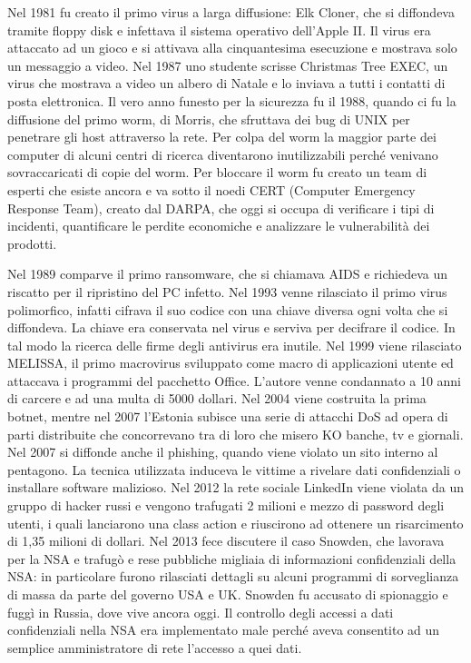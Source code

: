 \vspace{4mm}

Nel 1981 fu creato il primo virus a larga diffusione: Elk Cloner, che si diffondeva tramite floppy disk e infettava il sistema operativo dell'Apple II. Il virus era attaccato ad un gioco e si attivava alla cinquantesima esecuzione e mostrava solo un messaggio a video. Nel 1987 uno studente scrisse Christmas Tree EXEC, un virus che mostrava a video un albero di Natale e lo inviava a tutti i contatti di posta elettronica. Il vero anno funesto per la sicurezza fu il 1988, quando ci fu la diffusione del primo worm, di Morris, che sfruttava dei bug di UNIX per penetrare gli host attraverso la rete. Per colpa del worm la maggior parte dei computer di alcuni centri di ricerca diventarono inutilizzabili perché venivano sovraccaricati di copie del worm. Per bloccare il worm fu creato un team di esperti che esiste ancora e va sotto il noedi CERT (Computer Emergency Response Team), creato dal DARPA, che oggi si occupa di verificare i tipi di incidenti, quantificare le perdite economiche e analizzare le vulnerabilità dei prodotti.

\vspace{4mm}

Nel 1989 comparve il primo ransomware, che si chiamava AIDS e richiedeva un riscatto per il ripristino del PC infetto. Nel 1993 venne rilasciato il primo virus polimorfico, infatti cifrava il suo codice con una chiave diversa ogni volta che si diffondeva. La chiave era conservata nel virus e serviva per decifrare il codice. In tal modo la ricerca delle firme degli antivirus era inutile. Nel 1999 viene rilasciato MELISSA, il primo macrovirus sviluppato come macro di applicazioni utente ed attaccava i programmi del pacchetto Office. L'autore venne condannato a 10 anni di carcere e ad una multa di 5000 dollari. Nel 2004 viene costruita la prima botnet, mentre nel 2007 l'Estonia subisce una serie di attacchi DoS ad opera di parti distribuite che concorrevano tra di loro che misero KO banche, tv e giornali. Nel 2007 si diffonde anche il phishing, quando viene violato un sito interno al pentagono. La tecnica utilizzata induceva le vittime a rivelare dati confidenziali o installare software malizioso. Nel 2012 la rete sociale LinkedIn viene violata da un gruppo di hacker russi e vengono trafugati 2 milioni e mezzo di password degli utenti, i quali lanciarono una class action e riuscirono ad ottenere un risarcimento di 1,35 milioni di dollari. Nel 2013 fece discutere il caso Snowden, che lavorava per la NSA e trafugò e rese pubbliche migliaia di informazioni confidenziali della NSA: in particolare furono rilasciati dettagli su alcuni programmi di sorveglianza di massa da parte del governo USA e UK. Snowden fu accusato di spionaggio e fuggì in Russia, dove vive ancora oggi. Il controllo degli accessi a dati confidenziali nella NSA era implementato male perché aveva consentito ad un semplice amministratore di rete l'accesso a quei dati.

